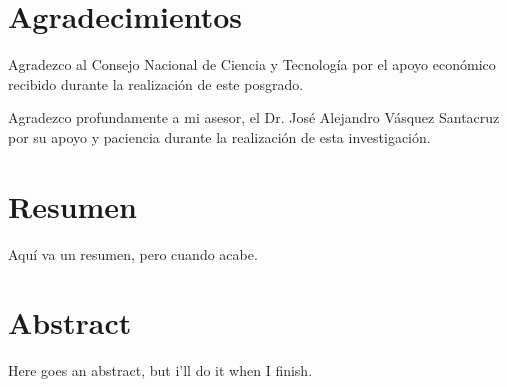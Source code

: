 \tableofcontents
\listoffigures
\listoftables

\chapter*{Agradecimientos} 

Agradezco al Consejo Nacional de Ciencia y Tecnología por el apoyo económico recibido durante la realización de este posgrado.

Agradezco profundamente a mi asesor, el Dr. José Alejandro Vásquez Santacruz por su apoyo y paciencia durante la realización de esta investigación.

\chapter*{Resumen}

Aquí va un resumen, pero cuando acabe.

\chapter*{Abstract}

Here goes an abstract, but i'll do it when I finish.


